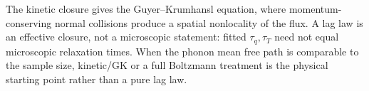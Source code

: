 \begin{summarybox}[Summary]
The kinetic closure gives the Guyer--Krumhansl equation, where momentum-conserving normal collisions produce a spatial nonlocality of the flux. A lag law is an effective closure, not a microscopic statement: fitted $\tau_q,\tau_T$ need not equal microscopic relaxation times. When the phonon mean free path is comparable to the sample size, kinetic/GK or a full Boltzmann treatment is the physical starting point rather than a pure lag law.
\end{summarybox}